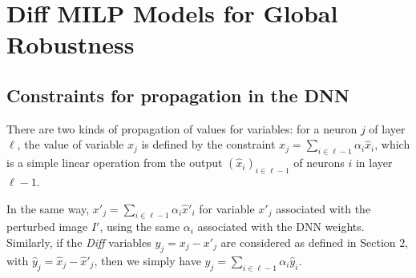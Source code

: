 \section{Diff MILP Models for Global Robustness}

\iffalse
\subsection{Constraints for propagation in the DNN}


There are two kinds of propagation of values for variables: 
for a neuron $j$ of layer $\ell$, the value of variable $x_j$ is defined by the constraint $x_j = \sum_{i \in \ell-1} \alpha_i \hat{x}_i$, which is a simple linear operation from the output $(\hat{x}_i)_{i \in \ell-1}$ of neurons $i$ in layer $\ell-1$.

In the same way, $x'_j = \sum_{i \in \ell-1} \alpha_i \hat{x}'_i$ 
for variable $x'_j$ associated with the perturbed image $I'$, using the same $\alpha_i$ associated with the DNN weights. Similarly, 
if the {\em Diff} variables $y_j = x_j - x'_j$ are considered as defined in Section 2, with $\hat{y}_j = \hat{x}_j - \hat{x}'_j$, then we simply have 
$y_j = \sum_{i \in \ell-1} \alpha_i \hat{y}_i$.

